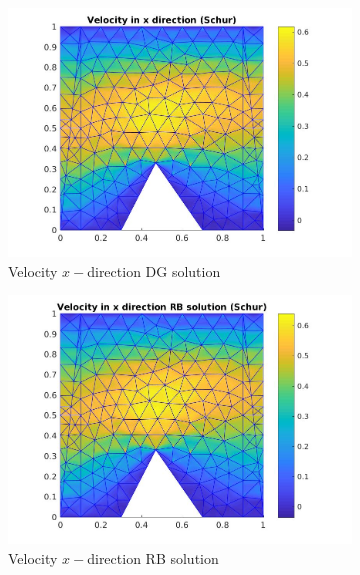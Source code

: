 \documentclass[graybox]{svmult}
\begin{document}
\begin{figure}%
\begin{subfigure}{0.31\textwidth}
\includegraphics[width=\linewidth]{offline_velocity_1_at_47_33.jpg}
\caption{Velocity $x-$direction DG solution} \label{vel_x_dg}
\end{subfigure}\hspace*{\fill}
\begin{subfigure}{0.31\textwidth}
\includegraphics[width=\linewidth]{online_velocity_1_at_47_33.jpg}
\caption{Velocity $x-$direction RB solution} \label{vel_x_rb}
\end{subfigure}
\begin{subfigure}{0.31\textwidth}

\end{subfigure}
\end{figure}
\end{document}
